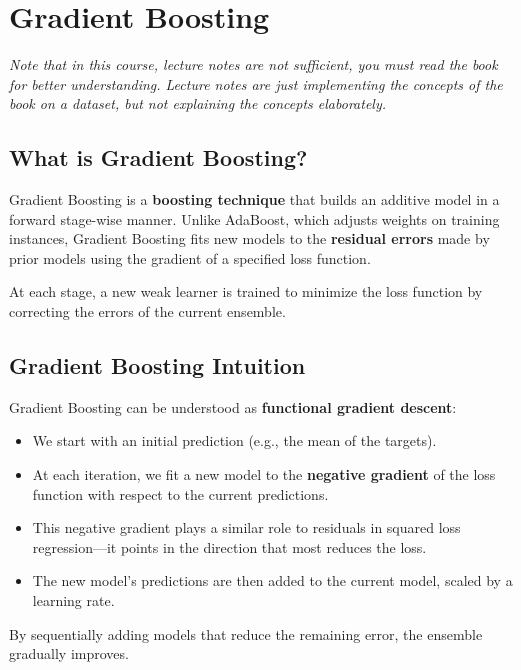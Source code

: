 \documentclass[
  letterpaper,
  DIV=11,
  numbers=noendperiod]{scrreprt}
\providecommand{\tightlist}{%
  \setlength{\itemsep}{0pt}\setlength{\parskip}{0pt}}\usepackage{longtable,booktabs,array}
\begin{document}
\chapter{Gradient Boosting}\label{gradient-boosting}

\emph{Note that in this course, lecture notes are not sufficient, you
must read the book for better understanding. Lecture notes are just
implementing the concepts of the book on a dataset, but not explaining
the concepts elaborately.}

\section{What is Gradient Boosting?}\label{what-is-gradient-boosting}

Gradient Boosting is a \textbf{boosting technique} that builds an
additive model in a forward stage-wise manner. Unlike AdaBoost, which
adjusts weights on training instances, Gradient Boosting fits new models
to the \textbf{residual errors} made by prior models using the gradient
of a specified loss function.

At each stage, a new weak learner is trained to minimize the loss
function by correcting the errors of the current ensemble.

\section{Gradient Boosting Intuition}\label{gradient-boosting-intuition}

Gradient Boosting can be understood as \textbf{functional gradient
descent}:

\begin{itemize}
\tightlist
\item
  We start with an initial prediction (e.g., the mean of the targets).
\item
  At each iteration, we fit a new model to the \textbf{negative
  gradient} of the loss function with respect to the current
  predictions.
\item
  This negative gradient plays a similar role to residuals in squared
  loss regression---it points in the direction that most reduces the
  loss.
\item
  The new model's predictions are then added to the current model,
  scaled by a learning rate.
\end{itemize}

By sequentially adding models that reduce the remaining error, the
ensemble gradually improves.
\end{document}

